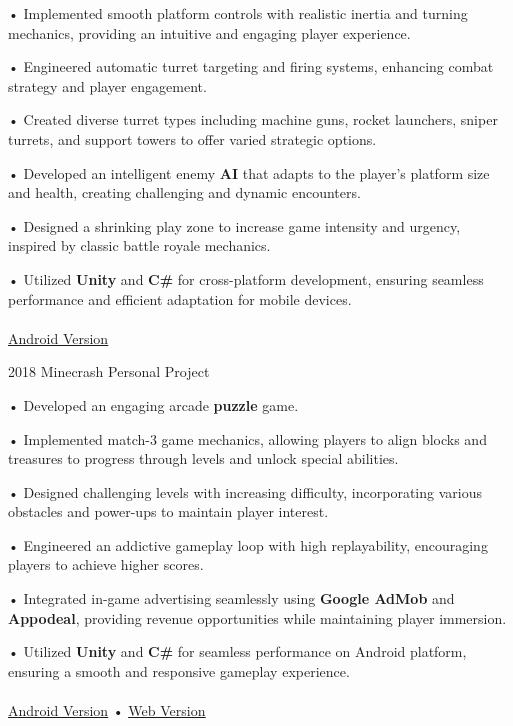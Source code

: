 \documentclass[9pt]{developercv} %
\begin{document}
\begin{entrylist}
{        • Implemented smooth platform controls with realistic inertia and turning mechanics, providing an intuitive and engaging player experience.

        • Engineered automatic turret targeting and firing systems, enhancing combat strategy and player engagement.

        • Created diverse turret types including machine guns, rocket launchers, sniper turrets, and support towers to offer varied strategic options.

        • Developed an intelligent enemy \textbf{AI} that adapts to the player's platform size and health, creating challenging and dynamic encounters.

        • Designed a shrinking play zone to increase game intensity and urgency, inspired by classic battle royale mechanics.

        • Utilized \textbf{Unity} and \textbf{C\#} for cross-platform development, ensuring seamless performance and efficient adaptation for mobile devices.
        \\
        \\
        \href{https://apkpure.com/ru/tower-raft-io/com.lazredgame.Tower.IO}{\uline{Android Version}}
        \\
    }
    \entry
    {2018}
    {Minecrash}
    {Personal Project}
    {

        • Developed an engaging arcade \textbf{puzzle} game.

        • Implemented match-3 game mechanics, allowing players to align blocks and treasures to progress through levels and unlock special abilities.

        • Designed challenging levels with increasing difficulty, incorporating various obstacles and power-ups to maintain player interest.

        • Engineered an addictive gameplay loop with high replayability, encouraging players to achieve higher scores.

        • Integrated in-game advertising seamlessly using \textbf{Google AdMob} and \textbf{Appodeal}, providing revenue opportunities while maintaining player immersion.

        • Utilized \textbf{Unity} and \textbf{C\#} for seamless performance on Android platform, ensuring a smooth and responsive gameplay experience.
        \\
        \\
        \href{https://apkpure.com/ru/minecrash/com.ekrem.game.minecrash}{\uline{Android Version}}
        •
        \href{https://ekrembayram.itch.io/minecrash}{\uline{Web Version}}
        \\
    }
\end{entrylist}

\end{document}
